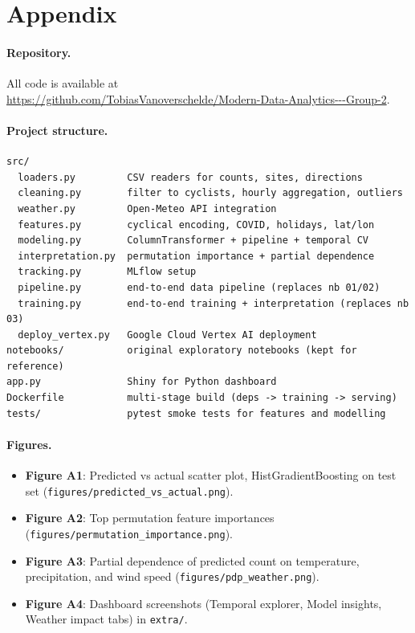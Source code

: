 \documentclass[11pt,a4paper]{article}
\begin{document}
\appendix
\section{Appendix}
\label{sec:appendix}

\paragraph{Repository.} All code is available at\\
\url{https://github.com/TobiasVanoverschelde/Modern-Data-Analytics---Group-2}.

\paragraph{Project structure.}

\begin{verbatim}
src/
  loaders.py         CSV readers for counts, sites, directions
  cleaning.py        filter to cyclists, hourly aggregation, outliers
  weather.py         Open-Meteo API integration
  features.py        cyclical encoding, COVID, holidays, lat/lon
  modeling.py        ColumnTransformer + pipeline + temporal CV
  interpretation.py  permutation importance + partial dependence
  tracking.py        MLflow setup
  pipeline.py        end-to-end data pipeline (replaces nb 01/02)
  training.py        end-to-end training + interpretation (replaces nb 03)
  deploy_vertex.py   Google Cloud Vertex AI deployment
notebooks/           original exploratory notebooks (kept for reference)
app.py               Shiny for Python dashboard
Dockerfile           multi-stage build (deps -> training -> serving)
tests/               pytest smoke tests for features and modelling
\end{verbatim}

\paragraph{Figures.}
\begin{itemize}[leftmargin=*]
  \item \textbf{Figure A1}: Predicted vs actual scatter plot,
  HistGradientBoosting on test set
  (\texttt{figures/predicted\_vs\_actual.png}).
  \item \textbf{Figure A2}: Top permutation feature importances
  (\texttt{figures/permutation\_importance.png}).
  \item \textbf{Figure A3}: Partial dependence of predicted count
  on temperature, precipitation, and wind speed
  (\texttt{figures/pdp\_weather.png}).
  \item \textbf{Figure A4}: Dashboard screenshots (Temporal
  explorer, Model insights, Weather impact tabs) in
  \texttt{extra/}.
\end{itemize}
\end{document}
